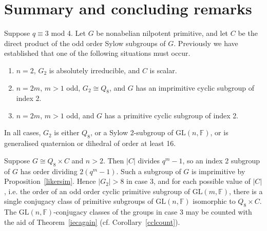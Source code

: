 \documentclass[12pt]{amsart}
\theoremstyle{definition}
\theoremstyle{remark}
\begin{document}
\section{Summary and concluding remarks}
\label{summary}

 Suppose $q\equiv 3$ mod 4. Let $G$ be nonabelian 
 nilpotent primitive, and let $C$ be the 
 direct product of the odd order Sylow subgroups of 
 $G$. Previously we have established that one of 
 the following situations must occur.
\begin{enumerate}
\item $n=2$, $G_2$ is absolutely irreducible, 
 and $C$ is scalar.
\item $n=2m$, $m>1$ odd, $G_2 \cong Q_8$, and
 $G$ has an imprimitive cyclic subgroup of index 2. 
\item $n=2m$, $m>1$ odd, and
 $G$ has a primitive cyclic subgroup of index 2. 
\end{enumerate}
 In all cases, $G_2$ is either $Q_8$,
  or a Sylow 2-subgroup of $\mathrm{GL}(n,\mathbb{F})$,
  or is generalised  quaternion or dihedral of order at least
 16. 
%
 

 Suppose $G \cong Q_8 \times C$
 and $n>2$. 
 Then $|C|$ divides $q^m-1$,
 so an index 2 subgroup of $G$ has order dividing 
 $2(q^m-1)$. Such a subgroup of 
 $G$ is imprimitive by Proposition~\ref{likersim}.
 Hence $|G_2| > 8$ in case 3, 
 and for each possible value of $|C|$, i.e. 
 the order of an odd order cyclic primitive subgroup 
 of $\mathrm{GL}(m, \mathbb{F})$, 
 there is a single conjugacy class of primitive 
 subgroups of $\mathrm{GL}(n,\mathbb{F})$ isomorphic
 to $Q_8 \times C$. The $\mathrm{GL}(n,\mathbb{F})$-conjugacy 
 classes of the groups in case 3 may be counted with the
 aid of Theorem~\ref{iecagain} (cf. Corollary~\ref{cclcount}).  
\end{document}
